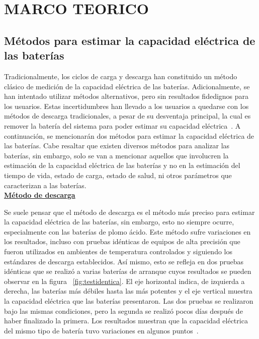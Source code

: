 \chapter{ MARCO TEORICO }
\section{Métodos para estimar la capacidad eléctrica de las baterías}

Tradicionalmente, los ciclos de carga y descarga han constituido un método clásico de medición de la capacidad eléctrica de las baterías. Adicionalmente, se han intentado utilizar métodos alternativos, pero sin resultados fidedignos para los usuarios. Estas incertidumbres han llevado a los usuarios a quedarse con los métodos de descarga tradicionales, a pesar de su desventaja principal, la cual es remover la batería del sistema para poder estimar su capacidad eléctrica~\cite{Buchmann2011}. A continuación, se mencionarán dos métodos para estimar la capacidad eléctrica de las baterías. Cabe resaltar que existen diversos métodos para analizar las baterías, sin embargo, solo se van a mencionar aquellos que involucren la estimación de la capacidad eléctrica de las baterías y no en la estimación del tiempo de vida, estado de carga, estado de salud, ni otros parámetros que caracterizan a las baterías. \\

\textbf{\underline{Método de descarga}}

Se suele pensar que el método de descarga es el método más preciso para estimar la capacidad eléctrica de las baterías, sin embargo, esto no siempre ocurre, especialmente con las baterías de plomo ácido. Este método sufre variaciones en los resultados, incluso con pruebas idénticas de equipos de alta precisión que fueron utilizados en ambientes de temperatura controlados y siguiendo los estándares de descarga establecidos. Así mismo, esto se refleja en dos pruebas idénticas que se realizó a varias baterías de arranque cuyos resultados se pueden observar en la figura ~\ref{fig:testidentica}. El eje horizontal indica, de izquierda a derecha, las baterías más débiles hasta las más potentes y el eje vertical muestra la capacidad eléctrica que las baterías presentaron. Las dos pruebas se realizaron bajo las mismas condiciones, pero la segunda se realizó pocos días después de haber finalizado la primera. Los resultados muestran que la capacidad eléctrica del mismo tipo de batería tuvo variaciones en algunos puntos~\cite{measurecapacity}.

